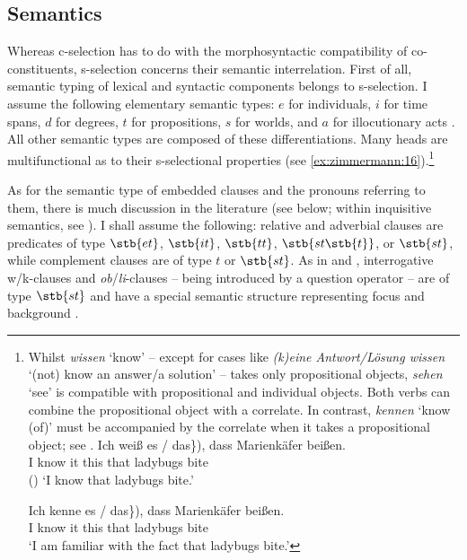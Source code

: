 \documentclass[output=paper]{langscibook}
\begin{document}

\subsection{Semantics}\label{s:2.2}

Whereas c-selection has to do with the morphosyntactic compatibility of co-constituents, s-selection concerns their semantic interrelation. First of all, semantic typing of lexical and syntactic components belongs to s-selection. I assume the following elementary semantic types: $e$ for individuals, $i$ for time spans, $d$ for degrees, $t$ for propositions, $s$ for worlds, and $a$ for illocutionary acts \citep[see][]{Krifka2004}. All other semantic types are composed of these differentiations. Many heads are multifunctional as to their s-selectional properties (see \ref{ex:zimmermann:16}).\footnote{Whilst \textit{wissen} `know' -- except for cases like \textit{(k)eine {Antwort/Lösung} wissen} `(not) know {an answer/a solution}' -- takes only propositional objects, \textit{sehen} `see' is compatible with propositional and individual objects. Both verbs can combine the propositional object with a correlate. In contrast, \textit{kennen} `know (of)' must be accompanied by the correlate when it takes a propositional object; see .
            \ea\label{ex:zimmermann:fn17}
                \ea \gll Ich weiß \minsp{(\{} es / das\}), dass Marienkäfer beißen.\\
                I know {} it {} this that ladybugs bite\\ \hfill ()
                \glt `I know that ladybugs bite.'

                \ex \gll Ich kenne \minsp{*(\{} es / das\}), dass Marienkäfer beißen.\\
                I know {} it {} this that ladybugs bite\\
                \glt `I am familiar with the fact that ladybugs bite.'
            \z\z}

As for the semantic type of embedded clauses and the pronouns referring to them, there is much discussion in the literature (see below; within inquisitive semantics, see \citealt{Roelofsen2019,TheilerRoelofsenAloni2018}). I shall assume the following: relative and adverbial clauses are predicates of type $\stb{et}$, $\stb{it}$, $\stb{tt}$, ${\stb{st\stb{t}}}$, or $\stb{st}$, while complement clauses are of type $t$ or $\stb{st}$. As in \citet{BrandtReisRosengrenZimmermann1992} and \citet{Zimmermann1993,Zimmermann2009}, interrogative w/k-clauses and \textit{ob}/\textit{li}-clauses -- being introduced by a question operator -- are of type $\stb{st}$ and have a special semantic structure representing focus and background \citep[see][]{Krifka2001}.
\end{document}
